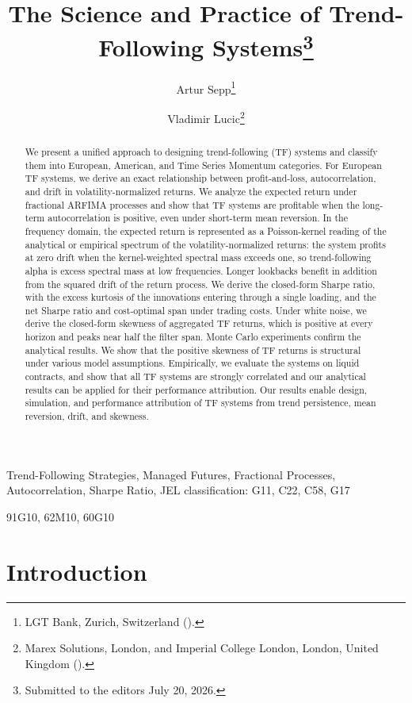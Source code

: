 \documentclass[hidelinks]{siamonline250211}
\title{The Science and Practice of Trend-Following Systems\thanks{Submitted to the editors July 20, 2026.}}
\author{Artur Sepp\thanks{LGT Bank, Zurich, Switzerland (\email{[REDACTED_EMAIL]}).}
\and Vladimir Lucic\thanks{Marex Solutions, London, and Imperial College London, London, United Kingdom (\email{[REDACTED_EMAIL]}).}}
\begin{document}
\maketitle

\begin{abstract}
	We present a unified approach to designing trend-following (TF) systems and classify them into European, American, and Time Series Momentum categories. For European TF systems, we derive an exact relationship between profit-and-loss, autocorrelation, and drift in volatility-normalized returns. We analyze the expected return under fractional ARFIMA processes and show that TF systems are profitable when the long-term autocorrelation is positive, even under short-term mean reversion. In the frequency domain, the expected return is represented as a Poisson-kernel reading of the analytical or empirical spectrum of the volatility-normalized returns: the system profits at zero drift when the kernel-weighted spectral mass exceeds one, so trend-following alpha is excess spectral mass at low frequencies. Longer lookbacks benefit in addition from the squared drift of the return process. We derive the closed-form Sharpe ratio, with the excess kurtosis of the innovations entering through a single loading, and the net Sharpe ratio and cost-optimal span under trading costs. Under white noise, we derive the closed-form skewness of aggregated TF returns, which is positive at every horizon and peaks near half the filter span. Monte Carlo experiments confirm the analytical results. We show that the positive skewness of TF returns is structural under various model assumptions. Empirically, we evaluate the systems on liquid contracts, and show that all TF systems are strongly correlated and our analytical results can be applied for their performance attribution.  Our results enable design, simulation, and performance attribution of TF systems from trend persistence, mean reversion, drift, and skewness.
\end{abstract}

\begin{keywords}
	Trend-Following Strategies, Managed Futures, Fractional Processes, Autocorrelation, Sharpe Ratio, JEL classification: G11, C22, C58, G17
\end{keywords}

\begin{MSCcodes}
	91G10, 62M10, 60G10
\end{MSCcodes}

\section{Introduction}
\end{document}
